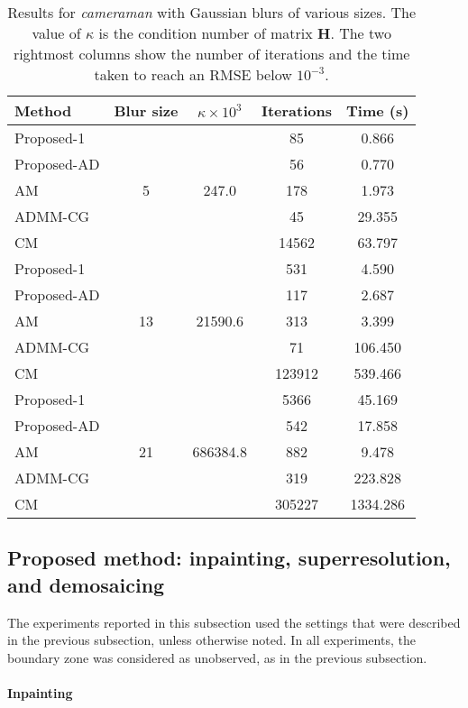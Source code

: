 \documentclass[10pt,twocolumn,twoside]{IEEEtran}
\newcommand{\Hm}{\mathbf{H}} %
\begin{document}
\begin{table}
	\renewcommand{\arraystretch}{1}
	\caption{Results for \textit{cameraman} with Gaussian blurs of various sizes. The value of $\kappa$ is the condition number of matrix $\Hm$. The two rightmost columns show the number of iterations and the time taken to reach an RMSE below $10^{-3}$.}
	\label{tab:results}
	\centering
\begin{tabular}{l|c|c|c|c}
Method &Blur size &$\kappa \times 10^3$ &Iterations &Time (s) \\
\hline
Proposed-1 & \multirow{5}{*}{5} & \multirow{5}{*}{247.0} &   85 & 0.866  \\
Proposed-AD & & &   56 & 0.770 \\
AM & & &  178 & 1.973 \\
ADMM-CG & & &   45 & 29.355 \\
CM & & & 14562 & 63.797 \\
\hline
Proposed-1 & \multirow{5}{*}{13} & \multirow{5}{*}{21590.6} &  531 & 4.590  \\
Proposed-AD & & &  117 & 2.687 \\
AM & & &  313 & 3.399 \\
ADMM-CG & & &   71 & 106.450 \\
CM & & & 123912 & 539.466 \\
\hline
Proposed-1 & \multirow{5}{*}{21} & \multirow{5}{*}{686384.8} & 5366 & 45.169  \\
Proposed-AD & & &  542 & 17.858 \\
AM & & &  882 & 9.478 \\
ADMM-CG & & &  319 & 223.828 \\
CM & & & 305227 & 1334.286 \\
\hline
\end{tabular}
\end{table}


\subsection{Proposed method: inpainting, superresolution, and demosaicing} \label{sec:exp_app}

The experiments reported in this subsection used the settings that were described in the previous subsection, unless otherwise noted. In all experiments, the boundary zone was considered as unobserved, as in the previous subsection.

\paragraph{Inpainting}
\end{document}
